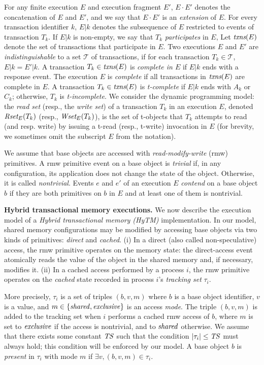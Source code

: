 For any finite execution $E$ and execution fragment $E'$, $E\cdot E'$ denotes the concatenation of $E$ and $E'$,
and we say that $E\cdot E'$ is an \emph{extension}
of $E$.
For every transaction identifier $k$,
$E|k$ denotes the subsequence of $E$ restricted to events of
transaction $T_k$.
If $E|k$ is non-empty,
we say that $T_k$ \emph{participates} in $E$,
Let $\textit{txns}(E)$ denote the set of transactions that participate in $E$.
Two executions $E$ and $E'$
are \emph{indistinguishable} to a set $\mathcal{T}$ of transactions, if
for each transaction $T_k \in \mathcal{T}$, $E|k=E'|k$.
A transaction $T_k\in \textit{txns}(E)$ is \emph{complete in $E$} if
$E|k$ ends with a response event.
The execution $E$ is \emph{complete} if all transactions in $\textit{txns}(E)$
are complete in $E$.
A transaction $T_k\in \textit{txns}(E)$ is \emph{t-complete} if $E|k$
ends with $A_k$ or $C_k$; otherwise, $T_k$ is \emph{t-incomplete}.
We consider the dynamic programming model: the \emph{read set} (resp., the \emph{write set}) of a transaction $T_k$ in an execution $E$,
denoted $\textit{Rset}_E(T_k)$ (resp., $\textit{Wset}_E(T_k)$), is the set of t-objects that $T_k$ attempts to read (and resp. write) 
by issuing a t-read (resp., t-write) invocation in $E$ (for brevity, we sometimes 
omit the subscript $E$ from the notation).

We assume that base objects are accessed with \emph{read-modify-write} (rmw) primitives. 
A rmw primitive event on a base object is \emph{trivial} if, in any configuration, its application
does not change the state of the object. 
Otherwise, it is called \emph{nontrivial}.
Events $e$ and $e'$ of an execution $E$  \emph{contend} on a base
object $b$ if they are both primitives on $b$ in $E$ and at least 
one of them is nontrivial.

\textbf{Hybrid transactional memory executions.}
We now describe the execution model of a \emph{Hybrid transactional memory (HyTM)} implementation.
In our model, shared memory configurations may be modified by accessing base objects via two kinds of
primitives: \emph{direct} and \emph{cached}.
(i) In a direct (also called non-speculative) access, the rmw primitive operates on the memory state:
the direct-access event atomically reads the value of the object in
the shared memory and, if necessary, modifies it.
(ii) In a cached access performed by a process $i$, the rmw primitive operates on the \emph{cached}
state recorded in process $i$'s \emph{tracking set} $\tau_i$.

More precisely, $\tau_i$ is a set of triples $(b, v, m)$ where $b$ is a base object identifier, $v$ is a value, 
and $m \in \{\mathit{shared}, \mathit{exclusive}\}$ is an access \emph{mode}. 
The triple $(b, v, m)$ is added to the tracking set when $i$ performs a cached
rmw access of $b$, where $m$ is set to $\mathit{exclusive}$ if the access is
nontrivial, and to $\mathit{shared}$ otherwise.  
We assume that there exists some constant $\mathit{TS}$
such that the condition $|\tau_i| \leq \mathit{TS}$ must always hold; this
condition will be enforced by our model.
A base object $b$ is \emph{present} in $\tau_i$ with mode $m$ if $\exists v, (b,v,m) \in \tau_i$.

